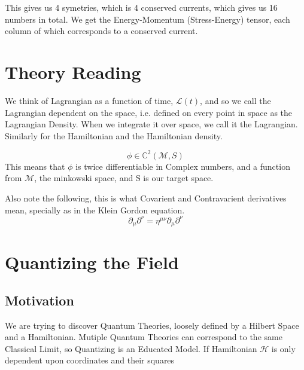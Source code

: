 This gives us 4 symetries, which is 4 conserved currents, which gives us 16 numbers in total. %
We get the Energy-Momentum (Stress-Energy) tensor, each column of which corresponds to a conserved current.







\section{Theory Reading}

We think of Lagrangian as a function of time, $\mathcal{L}(t)$, and so we call the Lagrangian dependent on the space, i.e. defined on every point in space as the Lagrangian Density. When we integrate it over space, we call it the Lagrangian. Similarly for the Hamiltonian and the Hamiltonian density.

\begin{definition}{}
  \begin{equation}
  \phi \in \mathbb{C}^2 (\mathcal{M}, S)
  \end{equation}
  This means that $\phi$ is twice differentiable in Complex numbers, and a function from $\mathcal{M}$, the minkowski space, and S is our target space.
\end{definition}

Also note the following, this is what Covarient and Contravarient derivatives mean, specially as in the Klein Gordon equation.
\begin{equation}
  \partial_\mu \partial^\nu = \eta^{\mu \nu} \partial_\mu \partial^\nu
\end{equation}



\section{Quantizing the Field}


\subsection{Motivation}

We are trying to discover Quantum Theories, loosely defined by a Hilbert Space and a Hamiltonian. Mutiple Quantum Theories can correspond to the same Classical Limit, so Quantizing is an Educated Model. If Hamiltonian $\mathcal{H}$ is only dependent upon coordinates and their squares

